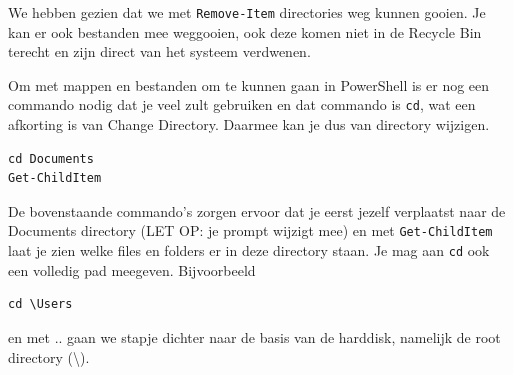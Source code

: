 We hebben gezien dat we met \texttt{Remove-Item} directories weg kunnen gooien. Je kan er ook bestanden mee weggooien, ook deze komen niet in de Recycle Bin terecht en zijn direct van het systeem verdwenen.

Om met mappen en bestanden om te kunnen gaan in PowerShell is er nog een commando nodig dat je veel zult gebruiken en dat commando is \texttt{cd}, wat een afkorting is van Change Directory. Daarmee kan je dus van directory wijzigen.

\begin{lstlisting}[style=DOS]
cd Documents
Get-ChildItem
\end{lstlisting}
De bovenstaande commando's zorgen ervoor dat je eerst jezelf verplaatst naar de Documents directory (LET OP: je prompt wijzigt mee) en met \texttt{Get-ChildItem} laat je zien welke files en folders er in deze directory staan. Je mag aan \texttt{cd} ook een volledig pad meegeven. Bijvoorbeeld
\begin{lstlisting}[style=DOS]
cd \Users
\end{lstlisting}
en met .. gaan we stapje dichter naar de basis van de harddisk, namelijk de root directory (\textbackslash).

